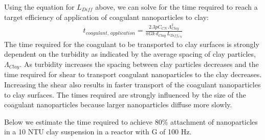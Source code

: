 \documentclass[letterpaper,10pt,english]{sphinxmanual}
\begin{document}
Using the equation for \(L_{Diff}\) above, we can solve for  the time required to reach a target efficiency of application of coagulant nanoparticles to clay:
\begin{equation}\label{equation:Rapid_Mix/RM_Theory_and_Future_Work:Rapid_Mix/RM_Theory_and_Future_Work:23}
\begin{split}t_{coagulant, \, application} = \frac{2.3p C_{CN} \, \Lambda_{Clay}^2}{\pi G k \, d_{Clay}\,  L_{Diff_{CN}} }\end{split}
\end{equation}
The time required for the coagulant to be transported to clay surfaces is strongly dependent on the turbidity as indicated by the average spacing of clay particles, \(\Lambda_{Clay}\). As turbidity increases the spacing between clay particles decreases and the time required for shear to transport coagulant nanoparticles to the clay decreases. Increasing the shear also results in faster transport of the coagulant nanoparticles to clay surfaces. The times required are strongly influenced by the size of the coagulant nanoparticles because larger nanoparticles diffuse more slowly.

Below we estimate the time required to achieve 80\% attachment of nanoparticles in a 10 NTU clay suspension in a reactor with G of 100 Hz.
\end{document}
